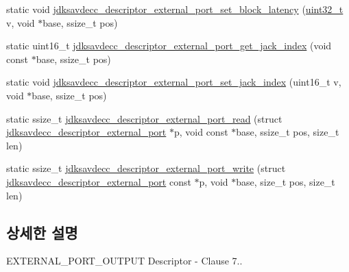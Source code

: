 \begin{DoxyCompactItemize}
\item 
static void \hyperlink{group__descriptor__external__port_ga684eaa4ea1864fd15c1ddd496bf52a5b}{jdksavdecc\+\_\+descriptor\+\_\+external\+\_\+port\+\_\+set\+\_\+block\+\_\+latency} (\hyperlink{parse_8c_a6eb1e68cc391dd753bc8ce896dbb8315}{uint32\+\_\+t} v, void $\ast$base, ssize\+\_\+t pos)
\item 
static uint16\+\_\+t \hyperlink{group__descriptor__external__port_ga9c5497dbe91aa7afbc59560bb3cb6fb9}{jdksavdecc\+\_\+descriptor\+\_\+external\+\_\+port\+\_\+get\+\_\+jack\+\_\+index} (void const $\ast$base, ssize\+\_\+t pos)
\item 
static void \hyperlink{group__descriptor__external__port_ga523a819c899b6ab8a66ad1f2cca37417}{jdksavdecc\+\_\+descriptor\+\_\+external\+\_\+port\+\_\+set\+\_\+jack\+\_\+index} (uint16\+\_\+t v, void $\ast$base, ssize\+\_\+t pos)
\item 
static ssize\+\_\+t \hyperlink{group__descriptor__external__port_gaadc9ebe37e1206ae38d998806f8e3365}{jdksavdecc\+\_\+descriptor\+\_\+external\+\_\+port\+\_\+read} (struct \hyperlink{structjdksavdecc__descriptor__external__port}{jdksavdecc\+\_\+descriptor\+\_\+external\+\_\+port} $\ast$p, void const $\ast$base, ssize\+\_\+t pos, size\+\_\+t len)
\item 
static ssize\+\_\+t \hyperlink{group__descriptor__external__port_ga65d622ba2c52e2ee2a1cfb2ceffcb271}{jdksavdecc\+\_\+descriptor\+\_\+external\+\_\+port\+\_\+write} (struct \hyperlink{structjdksavdecc__descriptor__external__port}{jdksavdecc\+\_\+descriptor\+\_\+external\+\_\+port} const $\ast$p, void $\ast$base, size\+\_\+t pos, size\+\_\+t len)
\end{DoxyCompactItemize}


\subsection{상세한 설명}
E\+X\+T\+E\+R\+N\+A\+L\+\_\+\+P\+O\+R\+T\+\_\+\+O\+U\+T\+P\+UT Descriptor -\/ Clause 7.. 

